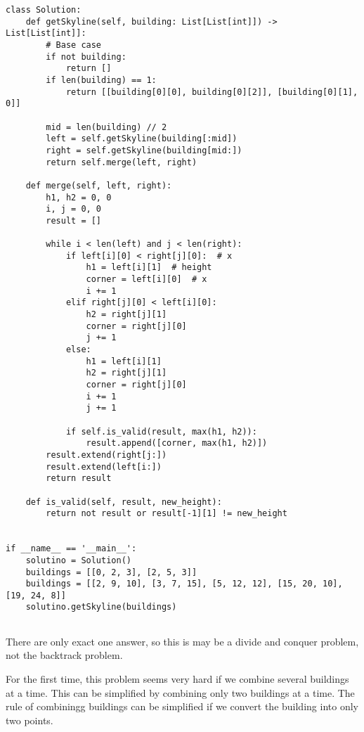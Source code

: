 \begin{lstlisting}
class Solution:
    def getSkyline(self, building: List[List[int]]) -> List[List[int]]:
        # Base case
        if not building:
            return []
        if len(building) == 1:
            return [[building[0][0], building[0][2]], [building[0][1], 0]]

        mid = len(building) // 2
        left = self.getSkyline(building[:mid])
        right = self.getSkyline(building[mid:])
        return self.merge(left, right)

    def merge(self, left, right):
        h1, h2 = 0, 0
        i, j = 0, 0
        result = []

        while i < len(left) and j < len(right):
            if left[i][0] < right[j][0]:  # x
                h1 = left[i][1]  # height
                corner = left[i][0]  # x
                i += 1
            elif right[j][0] < left[i][0]:
                h2 = right[j][1]
                corner = right[j][0]
                j += 1
            else:
                h1 = left[i][1]
                h2 = right[j][1]
                corner = right[j][0]
                i += 1
                j += 1

            if self.is_valid(result, max(h1, h2)):
                result.append([corner, max(h1, h2)])
        result.extend(right[j:])
        result.extend(left[i:])
        return result

    def is_valid(self, result, new_height):
        return not result or result[-1][1] != new_height


if __name__ == '__main__':
    solutino = Solution()
    buildings = [[0, 2, 3], [2, 5, 3]]
    buildings = [[2, 9, 10], [3, 7, 15], [5, 12, 12], [15, 20, 10], [19, 24, 8]]
    solutino.getSkyline(buildings)
  
\end{lstlisting}


There are only exact one answer, so this is may be a divide and conquer problem, not the backtrack problem.

For the first time, this problem seems very hard if we combine several buildings at a time.
This can be simplified by combining only two buildings at a time.
The rule of combiningg buildings can be simplified if we convert the building into only two points.